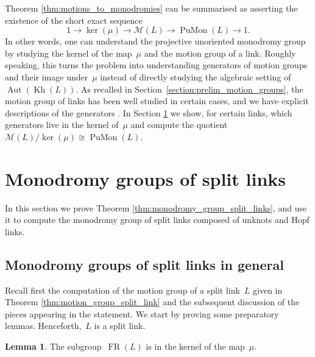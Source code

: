 \documentclass{amsart}
\theoremstyle{definition}
\theoremstyle{definition}
\theoremstyle{definition}
\theoremstyle{definition}
\newtheorem{lemma}[theorem]{Lemma}
\newcommand{\calM}{\mathcal{M}}
\DeclareMathOperator{\PuMon}{PuMon}
\DeclareMathOperator{\Kh}{Kh}
\DeclareMathOperator{\Aut}{Aut}
\DeclareMathOperator{\FR}{FR}
\begin{document}
 
Theorem \ref{thm:motions_to_monodromies} can be summarised as asserting the existence of the short exact sequence 
\begin{equation*}
        1 \to \ker (\mu) \to \calM(L) \to \PuMon(L)\to 1.
\end{equation*} 
In other words, one can understand the projective unoriented monodromy group by studying the kernel of the map~$\mu$ and the motion group of a link. Roughly speaking, this turns the problem into understanding generators of motion groups and their image under~$\mu$ instead of directly studying the algebraic setting of~$\Aut(\Kh(L))$. As recalled in Section~\ref{section:prelim_motion_groups}, the motion group of links has been well studied in certain cases, and we have explicit descriptions of the generators \cite{Dahm62, Goldsmith, Goldsmith_torus, BrendleHatcherRingsWickets13, BellingeriBodinBraidGroupNecklace16, DamianiKamadaRingHTrivialLinks19, Boyd-Bregman-Hopf, Boyd-Bregman}. In Section \ref{section:monodromy_split_links} we show, for certain links, which generators live in the kernel of~$\mu$ and compute the quotient~$\calM (L)/\ker (\mu) \cong \PuMon(L)$.




\section{Monodromy groups of split links}\label{section:monodromy_split_links}

In this section we prove Theorem \ref{thm:monodromy_group_split_links}, and use it to compute the monodromy group of split links composed of unknots and Hopf links.

\subsection{Monodromy groups of split links in general}\label{subsec:monodromy groups of split links in general}
 
Recall first the computation of the motion group of a split link~$L$ given in Theorem \ref{thm:motion_group_split_link} and the subsequent discussion of the pieces appearing in the statement. We start by proving some preparatory lemmas. Henceforth,~$L$ is a split link.

\begin{lemma}\label{lem:fr_kernel}
    The subgroup~$\FR(L)$ is in the kernel of the map~$\mu$.
\end{lemma}
\end{document}
